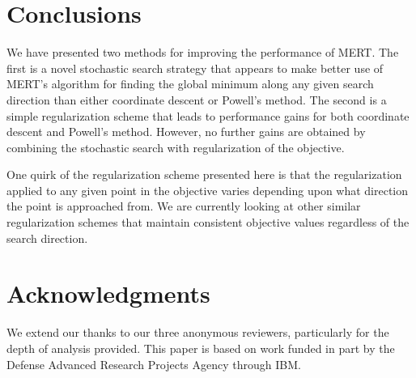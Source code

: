 \documentclass[11pt,tightenlines,kern-1pt]{article}
\begin{document}
\section{Conclusions}

We have presented two methods for improving the performance of MERT. The first is a novel stochastic search strategy that appears to make better use of MERT's algorithm for finding the global minimum along any given search direction than either coordinate descent or Powell's method. The second is a simple regularization scheme that leads to performance gains for both coordinate descent and Powell's method. However, no further gains are obtained by combining the stochastic search with regularization of the objective.   

One quirk of the regularization scheme presented here is that the regularization applied to any given point in the objective varies depending upon what direction the point is approached from. We are currently looking at other similar regularization schemes that maintain consistent objective values regardless of the search direction.  

\section{Acknowledgments}

{\small
We extend our thanks to our three anonymous reviewers, particularly for the depth of analysis provided. This paper is based on work funded in part by the Defense Advanced Research Projects Agency through IBM. 
}




\end{document}
